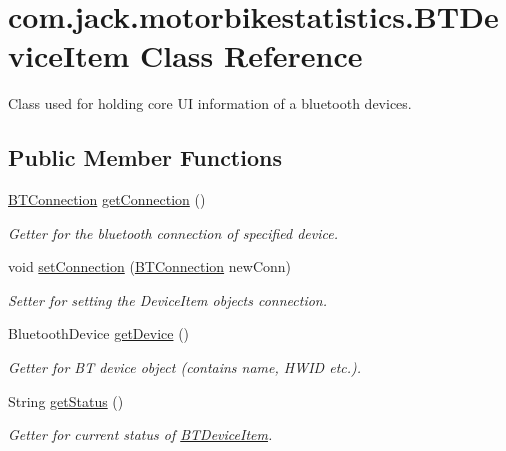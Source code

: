 \hypertarget{classcom_1_1jack_1_1motorbikestatistics_1_1_b_t_device_item}{}\section{com.\+jack.\+motorbikestatistics.\+B\+T\+Device\+Item Class Reference}
\label{classcom_1_1jack_1_1motorbikestatistics_1_1_b_t_device_item}


Class used for holding core UI information of a bluetooth devices.  


\subsection*{Public Member Functions}
\begin{DoxyCompactItemize}
\item 
\hyperlink{classcom_1_1jack_1_1motorbikestatistics_1_1_b_t_connection}{B\+T\+Connection} \hyperlink{classcom_1_1jack_1_1motorbikestatistics_1_1_b_t_device_item_ac3fbff10e5a5b3142ef648bf186b9be0}{get\+Connection} ()
\begin{DoxyCompactList}\small\item\em Getter for the bluetooth connection of specified device. \end{DoxyCompactList}\item 
void \hyperlink{classcom_1_1jack_1_1motorbikestatistics_1_1_b_t_device_item_a96f7261d9eab97d74569fbc3b0da4f28}{set\+Connection} (\hyperlink{classcom_1_1jack_1_1motorbikestatistics_1_1_b_t_connection}{B\+T\+Connection} new\+Conn)
\begin{DoxyCompactList}\small\item\em Setter for setting the Device\+Item object\textquotesingle{}s connection. \end{DoxyCompactList}\item 
Bluetooth\+Device \hyperlink{classcom_1_1jack_1_1motorbikestatistics_1_1_b_t_device_item_aab406fd517db729f7803d48546fd1a95}{get\+Device} ()
\begin{DoxyCompactList}\small\item\em Getter for BT device object (contains name, H\+W\+ID etc.). \end{DoxyCompactList}\item 
String \hyperlink{classcom_1_1jack_1_1motorbikestatistics_1_1_b_t_device_item_aee33189f94c2a428ac67301b536dd004}{get\+Status} ()
\begin{DoxyCompactList}\small\item\em Getter for current status of \hyperlink{classcom_1_1jack_1_1motorbikestatistics_1_1_b_t_device_item}{B\+T\+Device\+Item}. \end{DoxyCompactList}\item 

\end{DoxyCompactItemize}
